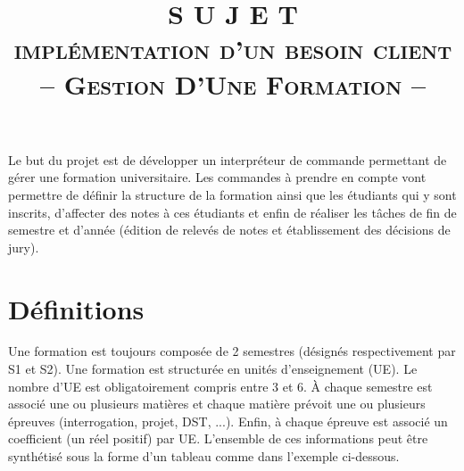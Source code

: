 \documentclass[10pt,a4paper,oneside]{article}
\begin{document}
\date{}
\author{}
\title{
    \vspace{-1.5cm}
    S U J E T\\
    {\Large \textsc{implémentation d'un besoin client}}\\
    \vspace{3 mm}
    {\Large -- \textsc{Gestion D'Une Formation} --}\\
}

\maketitle

\vspace{-1.5cm}

Le but du projet est de développer un interpréteur de commande permettant de gérer une formation universitaire. Les commandes à prendre en compte vont permettre de définir la structure de la formation ainsi que les étudiants qui y sont inscrits, d'affecter des notes à ces étudiants et enfin de réaliser les tâches de fin de semestre et d'année (édition de relevés de notes et établissement des décisions de jury).

\section{Définitions}

Une formation est toujours composée de 2 semestres (désignés respectivement par S1 et S2). Une formation est structurée en unités d'enseignement (UE). Le nombre d'UE est obligatoirement compris entre 3 et 6. \`A chaque semestre est associé une ou plusieurs matières et chaque matière prévoit une ou plusieurs épreuves (interrogation, projet, DST, ...). Enfin, à chaque épreuve est associé un coefficient (un réel positif) par UE. L'ensemble de ces informations peut être synthétisé sous la forme d'un tableau comme dans l'exemple ci-dessous.
\end{document}
